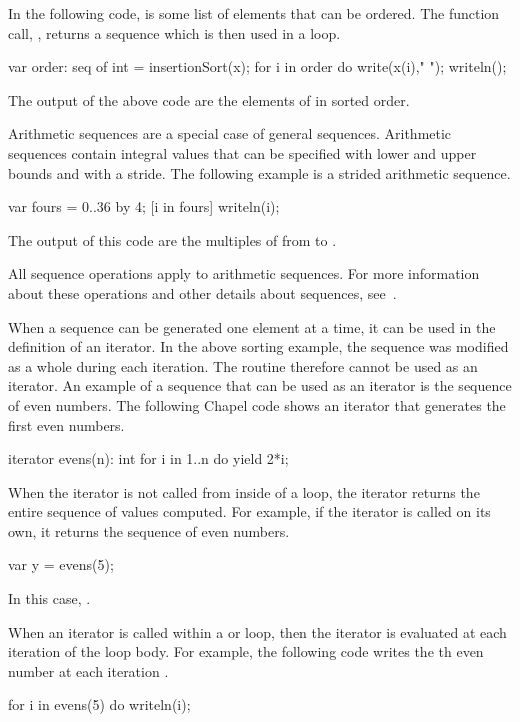 In the following code,  is some list of elements that can be
ordered.  The function call, , returns a sequence which
is then used in a  loop. 
\begin{chapel}
var order: seq of int = insertionSort(x);
for i in order do write(x(i)," ");
writeln(); 
\end{chapel}
The output of the above code are the elements of  in sorted order.

Arithmetic sequences are a special case of general sequences.  Arithmetic
sequences contain integral values that can be specified with lower and upper
bounds and with a stride.  The following example is a strided arithmetic sequence.
\begin{chapel}
var fours = 0..36 by 4;
[i in fours] writeln(i);
\end{chapel}
The output of this code are the multiples of  from  to
.

All sequence operations apply to arithmetic sequences.  For more information
about these operations and other details about sequences, see~.

When a sequence can be generated one element at a time, it can be used
in the definition of an iterator.  In the above sorting example, the 
sequence was modified as a whole during each iteration.  The routine
 therefore cannot be used as an iterator.  An example
of a sequence that can be used as an iterator is the sequence of even
numbers.  The following Chapel code shows an iterator that generates 
the first  even numbers.  
\begin{chapel}
iterator evens(n): int {
  for i in 1..n do yield 2*i;
}
\end{chapel}
When the iterator is not called from inside of a loop, the iterator returns
the entire sequence of values computed.  For example, if the  iterator
is called on its own, it returns the sequence of  even numbers.
\begin{chapel}
var y = evens(5);
\end{chapel}
In this case, .

When an iterator is called within a  or  loop,
then the iterator is evaluated at each iteration of the loop body.
For example, the following code writes the th even number at 
each iteration .
\begin{chapel}
for i in evens(5) do writeln(i);
\end{chapel}

